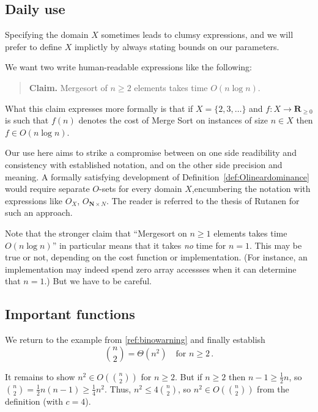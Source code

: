 \documentclass{tstextbook}
\begin{document}
\subsection{Daily use}

Specifying the domain $X$ sometimes leads to clumsy expressions, and we will prefer to define $X$ implictly by always stating bounds on our parameters.

\begin{example}
  We want two write human-readable expressions like the following:

  \begin{quote}
  {\bf Claim.} Mergesort of $n\geq 2$ elements takes time $O(n\log n)$.
  \end{quote}

  What this claim expresses more formally is that if $X=\{2,3,\ldots\}$ and $f\colon X\rightarrow\mathbf R_{\geq 0}$ is such that $f(n)$ denotes the cost of Merge Sort on instances of size $n\in X$ then $f\in O(n\log n)$.
\end{example}

Our use here aims to strike a compromise between on one side readibility and consistency with established notation, and on the other side precision and meaning.
A formally satisfying development of Definition~\ref{def:Olineardominance} would require separate $O$-sets for every domain $X$,encumbering the notation with expressions like $O_X$, $O_{\mathbf N\times N}$.
The reader is referred to the thesis of Rutanen for such an approach.


\begin{example}
  Note that the stronger claim that ``Mergesort on $n\geq 1$ elements takes time $O(n\log n)$'' in particular means that it takes \emph{no} time for $n=1$.
  This may be true or not, depending on the cost function or implementation. 
  (For instance, an implementation may indeed spend zero array accessses when it can determine that $n=1$.)
  But we have to be careful.
\end{example}

\subsection{Important functions}

\begin{example}
  We return to the example from \ref{ref:binowarning} and finally establish
  \[ \binom{n}{2} = \Theta(n^2) \quad\text{for } n\geq 2\,.\]

  It remains to show $n^2\in O(\binom{n}{2})$ for $n\geq 2$.
  But if $n\geq 2$ then $n-1 \geq \frac12n$, so
  $\binom{n}{2} = \frac12n(n-1) \geq  \frac14n^2$.
  Thus, $n^2\leq 4\binom{n}{2}$, so $n^2\in O(\binom{n}{2})$ from the definition (with $c=4$).
\end{example}
\end{document}
